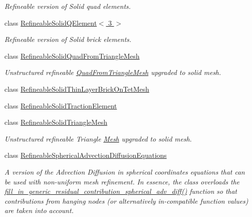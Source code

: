 \begin{DoxyCompactItemize}
\begin{DoxyCompactList}\small\item\em Refineable version of Solid quad elements. \end{DoxyCompactList}\item 
class \hyperlink{classoomph_1_1RefineableSolidQElement_3_013_01_4}{Refineable\+Solid\+Q\+Element$<$ 3 $>$}
\begin{DoxyCompactList}\small\item\em Refineable version of Solid brick elements. \end{DoxyCompactList}\item 
class \hyperlink{classoomph_1_1RefineableSolidQuadFromTriangleMesh}{Refineable\+Solid\+Quad\+From\+Triangle\+Mesh}
\begin{DoxyCompactList}\small\item\em Unstructured refineable \hyperlink{classoomph_1_1QuadFromTriangleMesh}{Quad\+From\+Triangle\+Mesh} upgraded to solid mesh. \end{DoxyCompactList}\item 
class \hyperlink{classoomph_1_1RefineableSolidThinLayerBrickOnTetMesh}{Refineable\+Solid\+Thin\+Layer\+Brick\+On\+Tet\+Mesh}
\item 
class \hyperlink{classoomph_1_1RefineableSolidTractionElement}{Refineable\+Solid\+Traction\+Element}
\item 
class \hyperlink{classoomph_1_1RefineableSolidTriangleMesh}{Refineable\+Solid\+Triangle\+Mesh}
\begin{DoxyCompactList}\small\item\em Unstructured refineable Triangle \hyperlink{classoomph_1_1Mesh}{Mesh} upgraded to solid mesh. \end{DoxyCompactList}\item 
class \hyperlink{classoomph_1_1RefineableSphericalAdvectionDiffusionEquations}{Refineable\+Spherical\+Advection\+Diffusion\+Equations}
\begin{DoxyCompactList}\small\item\em A version of the Advection Diffusion in spherical coordinates equations that can be used with non-\/uniform mesh refinement. In essence, the class overloads the \hyperlink{classoomph_1_1RefineableSphericalAdvectionDiffusionEquations_a08a48e0e7e544ec61f4adde6c5e41211}{fill\+\_\+in\+\_\+generic\+\_\+residual\+\_\+contribution\+\_\+spherical\+\_\+adv\+\_\+diff()} function so that contributions from hanging nodes (or alternatively in-\/compatible function values) are taken into account. \end{DoxyCompactList}\item 

\end{DoxyCompactItemize}
